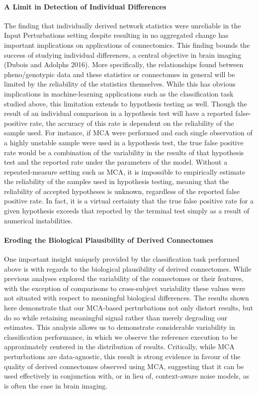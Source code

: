 \documentclass[fleqn,10pt]{SelfArx} %
\begin{document}
\paragraph{A Limit in Detection of Individual Differences}
The finding that individually derived network statistics were unreliable in the Input Perturbations setting despite
resulting in no aggregated change has important implications on applications of connectomics. This finding bounds the
success of studying individual differences, a central objective in brain imaging (Dubois and Adolphs 2016). More
specifically, the relationships found between pheno/genotypic data and these statistics or connectomes in general will
be limited by the reliability of the statistics themselves. While this has obvious implications in machine-learning
applications such as the classification task studied above, this limitation extends to hypothesis testing as well.
Though the result of an individual comparison in a hypothesis test will have a reported false-positive rate, the
accuracy of this rate is dependent on the reliability of the sample used. For instance, if MCA were performed and each
single observation of a highly unstable sample were used in a hypothesis test, the true false positive rate would be a
combination of the variability in the results of that hypothesis test and the reported rate under the parameters of the
model. Without a repeated-measure setting such as MCA, it is impossible to empirically estimate the reliability of the
samples used in hypothesis testing, meaning that the reliability of accepted hypotheses is unknown, regardless of the
reported false positive rate. In fact, it is a virtual certainty that the true false positive rate for a given
hypothesis exceeds that reported by the terminal test simply as a result of numerical instabilities.

\paragraph{Eroding the Biological Plausibility of Derived Connectomes}
One important insight uniquely provided by the classification task performed above is with regards to the biological
plausibility of derived connectomes. While previous analyses explored the variability of the connectomes or their
features, with the exception of comparisons to cross-subject variability these values were not situated with respect to
meaningful biological differences. The results shown here demonstrate that our MCA-based perturbations not only distort
results, but do so while retaining meaningful signal rather than merely degrading our estimates. This analysis allows
us to demonstrate considerable variability in classification performance, in which we observe the reference execution
to be approximately centered in the distribution of results. Critically, while MCA perturbations are data-agnostic,
this result is strong evidence in favour of the quality of derived connectomes observed using MCA, suggesting that it
can be used effectively in conjunction with, or in lieu of, context-aware noise models, as is often the case in brain
imaging. 
\end{document}

